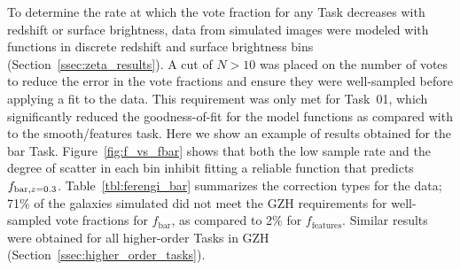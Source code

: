 \documentclass[twocolumn]{aastex6}
\begin{document}
To determine the rate at which the vote fraction for any Task decreases with
redshift or surface brightness, data from simulated \ferengi{} images were
modeled with functions in discrete redshift and surface brightness bins
(Section~\ref{ssec:zeta_results}). A cut of $N>10$ was placed on the number of
votes to reduce the error in the vote fractions and ensure they were
well-sampled before applying a fit to the data. This requirement was only met
for Task~01, which significantly reduced the goodness-of-fit for the model
functions as compared with to the smooth/features task. Here we show an
example of results obtained for the bar Task. Figure~\ref{fig:f_vs_fbar}
shows that both the low sample rate and the degree of scatter in each bin
inhibit fitting a reliable function that predicts $f_{{\rm bar},z=0.3}$.
Table~\ref{tbl:ferengi_bar} summarizes the correction types for the
\ferengi{} data; 71\% of the galaxies simulated did not meet the GZH
requirements for well-sampled vote fractions for $f_\mathrm{bar}$, as
compared to 2\% for $f_\mathrm{features}$. Similar results were obtained
for all higher-order Tasks in GZH (Section~\ref{ssec:higher_order_tasks}).  
\end{document}
